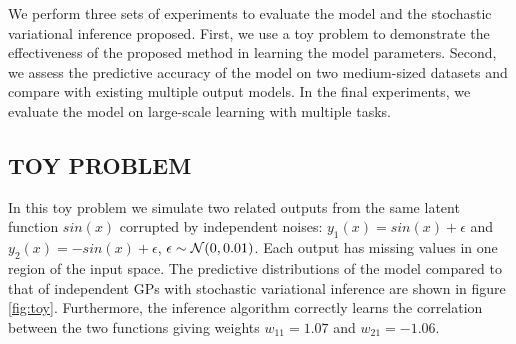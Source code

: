 We perform three sets of experiments to evaluate the model and the stochastic variational inference proposed. 
First, we use a toy problem to demonstrate the effectiveness of the proposed method in learning the model parameters.
Second, we assess the predictive accuracy of the model on two medium-sized datasets and compare with existing multiple output models.
In the final experiments, we evaluate the model on large-scale learning with multiple tasks.

\subsection{TOY PROBLEM}
In this toy problem we simulate two related outputs from the same latent function $sin(x)$ corrupted by independent noises: $y_1(x) = sin(x) + \epsilon$ and $y_2(x) = -sin(x) + \epsilon$, $\epsilon \sim \mathcal{N}(0,0.01)$.
Each output has missing values in one region of the input space.
The predictive distributions of the model compared to that of independent GPs with stochastic variational inference are shown in figure \ref{fig:toy}.
Furthermore, the inference algorithm correctly learns the correlation between the two functions giving weights $w_{11} = 1.07$ and $w_{21} = -1.06$.

